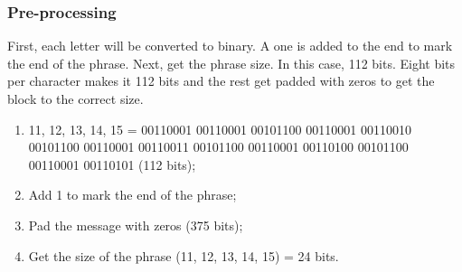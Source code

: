     
        
        \subsubsection{ Pre-processing}
        First, each letter will be converted to binary. A one is added to the end to mark the end of the phrase. Next, get the phrase size. In this case, 112 bits. Eight bits per character makes it 112 bits and the rest get padded with zeros to get the block to the correct size. 
        
        \begin{enumerate}[label=\roman*.]
            
            \item 11, 12, 13, 14, 15 = 00110001 00110001 00101100 00110001 00110010 00101100 00110001 00110011 00101100 00110001 00110100 00101100 00110001 00110101 (112 bits);
            
            \item Add 1 to mark the end of the phrase;
            
            \item Pad the message with zeros (375 bits);
            
            \item Get the size of the phrase (11, 12, 13, 14, 15) = 24 bits.
            
        \end{enumerate}
        
